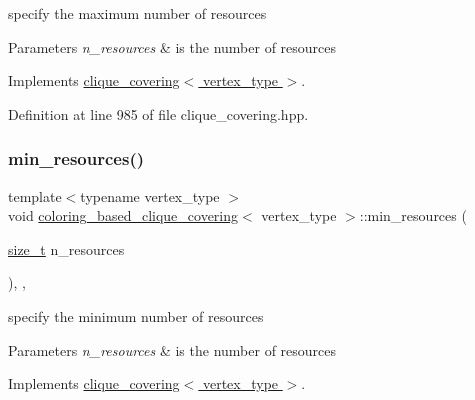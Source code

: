 specify the maximum number of resources 


\begin{DoxyParams}{Parameters}
{\em n\+\_\+resources} & is the number of resources \\
\hline
\end{DoxyParams}


Implements \hyperlink{classclique__covering_a4bdfaa7dece2c8c97f09a2a1a4827cb4}{clique\+\_\+covering$<$ vertex\+\_\+type $>$}.



Definition at line 985 of file clique\+\_\+covering.\+hpp.

\mbox{\label{classcoloring__based__clique__covering_a3c62b282cc45d953e778193beca5b5d4}} 
\subsubsection{\texorpdfstring{min\+\_\+resources()}{min\_resources()}}
{\footnotesize\ttfamily template$<$typename vertex\+\_\+type $>$ \\
void \hyperlink{classcoloring__based__clique__covering}{coloring\+\_\+based\+\_\+clique\+\_\+covering}$<$ vertex\+\_\+type $>$\+::min\+\_\+resources (\begin{DoxyParamCaption}\item[{\hyperlink{tutorial__fpt__2017_2intro_2sixth_2test_8c_a7c94ea6f8948649f8d181ae55911eeaf}{size\+\_\+t}}]{n\+\_\+resources }\end{DoxyParamCaption})\hspace{0.3cm}{\ttfamily [inline]}, {\ttfamily [override]}, {\ttfamily [virtual]}}



specify the minimum number of resources 


\begin{DoxyParams}{Parameters}
{\em n\+\_\+resources} & is the number of resources \\
\hline
\end{DoxyParams}


Implements \hyperlink{classclique__covering_a031948f90f5b05911a91b85c578fc9ca}{clique\+\_\+covering$<$ vertex\+\_\+type $>$}.



